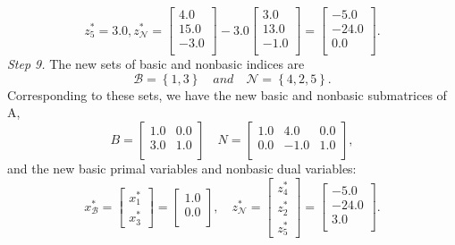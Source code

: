 \documentclass [12pt] {article}
\begin{document}
\[
z^*_5 = 3.0,        z^*_{\mathcal N} = 
\begin{bmatrix} 4.0 \\ 15.0 \\ -3.0 \\ \end{bmatrix} - 3.0 \begin{bmatrix} 3.0 \\ 13.0 \\ -1.0 \\ \end{bmatrix} = \begin{bmatrix} -5.0 \\ -24.0 \\ 0.0 \\ \end{bmatrix} .
\]
\textit{Step 9.} The new sets of basic and nonbasic indices are
\[
{\mathcal B} = \left \{ 1, 3 \right \}  \quad
and    \quad
{\mathcal N} = \left \{ 4, 2, 5 \right \}.
\]
Corresponding to these sets, we have the new basic and nonbasic submatrices of A,
\[
B = \begin{bmatrix} 1.0 & 0.0 \\ 3.0 & 1.0 \\ \end{bmatrix}  \quad
N = \begin{bmatrix} 1.0 & 4.0 & 0.0 \\ 0.0 & -1.0 & 1.0 \\ \end{bmatrix},
\]
and the new basic primal variables and nonbasic dual variables:
\[
 x^*_{\mathcal B} = 
\begin{bmatrix} x^*_1 \\ x^*_3 \end{bmatrix} = \begin{bmatrix} 1.0 \\ 0.0 \\ \end{bmatrix} ,   \quad
z^*_{\mathcal N} = 
\begin{bmatrix} z^*_4 \\ z^*_2 \\ z^*_5 \end{bmatrix} = \begin{bmatrix} -5.0 \\ -24.0 \\ 3.0 \\ \end{bmatrix}.
\]
\end{document}
